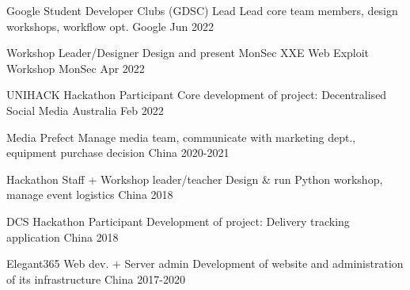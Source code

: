 

\begin{cvhonors}

   \cvhonor
   {Google Student Developer Clubs (GDSC) Lead}
   {Lead core team members, design workshops, workflow opt.}
   {Google}
   {Jun 2022}

   \cvhonor
   {Workshop Leader/Designer}
   {Design and present MonSec XXE Web Exploit Workshop}
   {MonSec}
   {Apr 2022}

%
%


%
%
%
%
%
   \cvhonor
   {UNIHACK Hackathon Participant} %
   {Core development of project: Decentralised Social Media} %
   {Australia} %
   {Feb 2022} %

   \cvhonor
   {Media Prefect} %
   {Manage media team, communicate with marketing dept., equipment purchase decision} %
   {China} %
   {2020-2021} %

   \cvhonor
   {Hackathon Staff + Workshop leader/teacher} %
   {Design \& run Python workshop, manage event logistics} %
   {China} %
   {2018} %

   \cvhonor
   {DCS Hackathon Participant} %
   {Development of project: Delivery tracking application} %
   {China} %
   {2018} %

   \cvhonor
   {Elegant365 Web dev. + Server admin} %
   {Development of website and administration of its infrastructure} %
   {China} %
   {2017-2020} %


\end{cvhonors}
